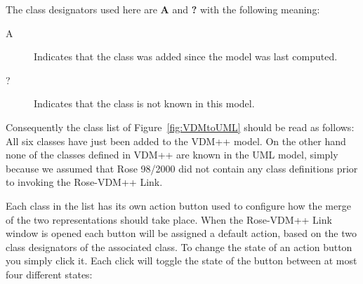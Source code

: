 \documentclass[\pformat,12pt]{article}
\newcommand{\vdmpp}{VDM++}
\newcommand{\link}{Rose-\vdmpp{} Link}
\newcommand{\rose}{Rose 98/2000}
\begin{document}
The class designators used here are {\bf A} and  {\bf ?} with the
following meaning: 

\begin{description}  
\item [A]       Indicates that the class was added since the model was last computed.  
\item [?]       Indicates that the class is not known in this model.  
\end{description}  

Consequently the class list of Figure~\ref{fig:VDMtoUML} should be read as follows: All six classes have just   
been added to the \vdmpp{} model. On the other hand none of the classes defined in \vdmpp{}   
are known in the UML model, simply because we assumed that \rose{} did not contain   
any class definitions prior to invoking the \link{}.  

Each class in the list has its own action button used to configure how
the merge of the two representations should take place. When the
\link{} window is opened each button will be assigned a default
action, based on the two class designators of the associated class. To
change the state of an action button you simply click it. Each click
will toggle the state of the button between at most four different
states:
\end{document}
